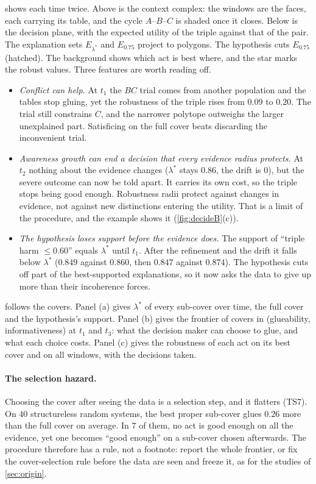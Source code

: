 \documentclass[11pt]{article}
\theoremstyle{definition}\newtheorem{definition}[theorem]{Definition}\newtheorem{remark}[theorem]{Remark}\newtheorem{example}[theorem]{Example}
\begin{document}
 shows each time twice. Above is the context complex: the windows are the faces, each carrying its table, and the cycle
$A$--$B$--$C$ is shaded once it closes. Below is the decision plane, with the expected utility of the triple against that of the pair. The
explanation sets $E_{\lambda^*}$ and $E_{0.75}$ project to polygons. The hypothesis cuts $E_{0.75}$ (hatched). The background shows which
act is best where, and the star marks the robust values. Three features are worth reading off.
\begin{itemize}
\item \emph{Conflict can help.} At $t_1$ the $BC$ trial comes from another population and the tables stop gluing, yet the robustness of
  the triple rises from $0.09$ to $0.20$. The trial still constrains $C$, and the narrower polytope outweighs the larger unexplained part.
  Satisficing on the full cover beats discarding the inconvenient trial.
\item \emph{Awareness growth can end a decision that every evidence radius protects.} At $t_2$ nothing about the evidence changes
  ($\lambda^*$ stays $0.86$, the drift is $0$), but the severe outcome can now be told apart. It carries its own cost, so the triple stops
  being good enough. Robustness radii protect against changes in evidence, not against new distinctions entering the utility. That is a
  limit of the procedure, and the example shows it (\cref{fig:decideB}(c)).
\item \emph{The hypothesis loses support before the evidence does.} The support of ``triple harm $\le0.60$'' equals $\lambda^*$ until
  $t_1$. After the refinement and the drift it falls below $\lambda^*$ ($0.849$ against $0.860$, then $0.847$ against $0.874$). The
  hypothesis cuts off part of the best-supported explanations, so it now asks the data to give up more than their incoherence forces.
\end{itemize}

 follows the covers. Panel (a) gives $\lambda^*$ of every sub-cover over time, the full cover and the hypothesis's
support. Panel (b) gives the frontier of covers in (glueability, informativeness) at $t_1$ and $t_3$: what the decision maker can choose to
glue, and what each choice costs. Panel (c) gives the robustness of each act on its best cover and on all windows, with the decisions taken.

\paragraph{The selection hazard.}
Choosing the cover after seeing the data is a selection step, and it flatters (TS7). On $40$ structureless random systems, the best proper
sub-cover glues $0.26$ more than the full cover on average. In $7$ of them, no act is good enough on all the evidence, yet one becomes
``good enough'' on a sub-cover chosen afterwards. The procedure therefore has a rule, not a footnote: report the whole frontier, or fix the
cover-selection rule before the data are seen and freeze it, as for the studies of \cref{sec:origin}.
\end{document}
